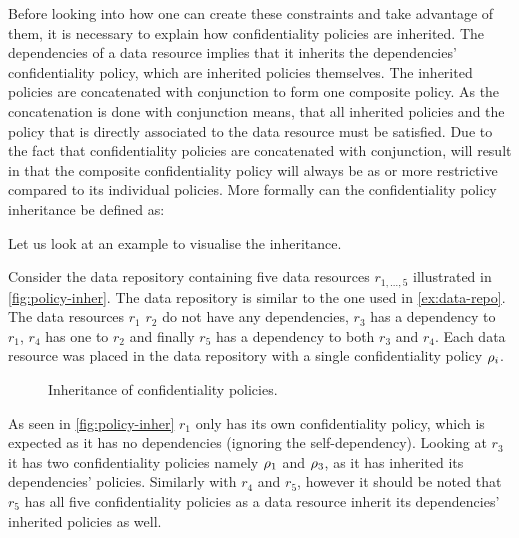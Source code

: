 Before looking into how one can create these constraints and take advantage of them, it is necessary to explain how confidentiality policies are inherited. The dependencies of a data resource implies that it inherits the dependencies' confidentiality policy, which are inherited policies themselves. The inherited policies are concatenated with conjunction to form one composite policy. As the concatenation is done with conjunction means, that all inherited policies and the policy that is directly associated to the data resource must be satisfied. Due to the fact that confidentiality policies are concatenated with conjunction, will result in that the composite confidentiality policy will always be as or more restrictive compared to its individual policies. More formally can the confidentiality policy inheritance be defined as:
\begin{definition}\label{def:cpi}
\end{definition}

Let us look at an example to visualise the inheritance.
\begin{example}
Consider the data repository containing five data resources $r_{1,\ldots,5}$ illustrated in \autoref{fig:policy-inher}. The data repository is similar to the one used in \autoref{ex:data-repo}. The data resources $r_1$ $r_2$ do not have any dependencies, $r_3$ has a dependency to $r_1$, $r_4$ has one to $r_2$ and finally $r_5$ has a dependency to both $r_3$ and $r_4$. Each data resource was placed in the data repository with a single confidentiality policy $\rho_i$.
\begin{figure}[!ht]
    \begin{center}
        
        \caption{Inheritance of confidentiality policies.}
        \label{fig:policy-inher}
    \end{center}
\end{figure}
As seen in \autoref{fig:policy-inher} $r_1$ only has its own confidentiality policy, which is expected as it has no dependencies (ignoring the self-dependency). Looking at $r_3$ it has two confidentiality policies namely $\rho_1$ and $\rho_3$, as it has inherited its dependencies' policies. Similarly with $r_4$ and $r_5$, however it should be noted that $r_5$ has all five confidentiality policies as a data resource inherit its dependencies' inherited policies as well.
\end{example}

